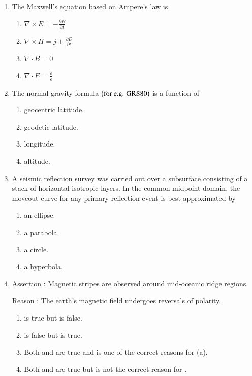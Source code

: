 \documentclass[journal,12pt,onecolumn]{IEEEtran}
\theoremstyle{remark}
\begin{document}
\begin{enumerate}
    \item The Maxwell's equation based on Ampere's law is \hfill{}
        \begin{enumerate} 
                \item $\nabla\times E=-\frac{\partial B}{\partial t}$ 
                \item $\nabla\times H=j+\frac{\partial D}{\partial t}$ 
                \item $\nabla\cdot B=0$ 
                \item $\nabla\cdot E=\frac{\rho}{\epsilon}$ 
        \end{enumerate}
        
    \item The normal gravity formula $\left(\text{for e.g. GRS}80\right)$ is a function of \hfill{}
        \begin{enumerate} 
                \item geocentric latitude.
                \item geodetic latitude.
                \item longitude.
                \item altitude.
        \end{enumerate}
    
    \item A seismic reflection survey was carried out over a subsurface consisting of a stack of horizontal isotropic layers. In the common midpoint  domain, the moveout  curve for any primary reflection event is best approximated by \hfill{}
        \begin{enumerate} 
                \item an ellipse.
                \item a parabola.
                \item a circle.
                \item a hyperbola.
        \end{enumerate}
        
    \item Assertion : Magnetic stripes are observed around mid-oceanic ridge regions.
    
    Reason : The earth's magnetic field undergoes reversals of polarity. \hfill{}
        \begin{enumerate} 
            \item {} is true but  is false.
            \item {} is false but  is true.
            \item Both  and  are true and  is one of the correct reasons for (a).
            \item Both  and  are true but  is not the correct reason for .
        \end{enumerate}
    

\end{enumerate}
\end{document}
